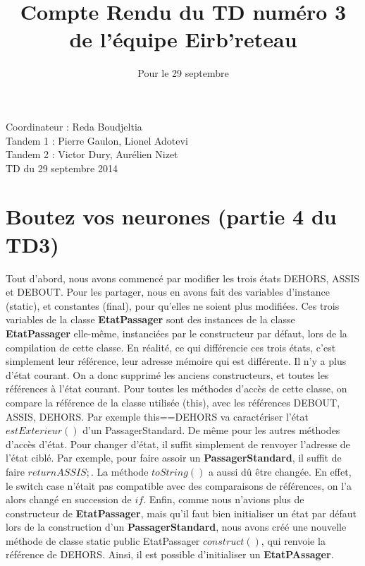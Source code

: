 \documentclass[a4paper,11pts]{article}
\begin{document}
\title{Compte Rendu du TD numéro 3 de l'équipe Eirb'reteau}
\date{Pour le 29 septembre}
\maketitle

\begin{center}
  Coordinateur : Reda Boudjeltia \\
  Tandem 1 : Pierre Gaulon, Lionel Adotevi\\
  Tandem 2 : Victor Dury,  Aurélien Nizet \\
  TD du 29 septembre 2014

\end{center}
\maketitle


\section{Boutez vos neurones (partie 4 du TD3)}
Tout d'abord, nous avons commencé par modifier les trois états DEHORS, ASSIS et DEBOUT. Pour les partager, nous en avons fait des variables d'instance (static), et constantes (final), pour qu'elles ne soient plus modifiées. Ces trois variables de la classe \textbf{EtatPassager} sont des instances de la classe \textbf{EtatPassager} elle-même, instanciées par le constructeur par défaut, lors de la compilation de cette classe. En réalité, ce qui différencie ces trois états, c'est simplement leur référence, leur adresse mémoire qui est différente. Il n'y a plus d'état courant. On a donc supprimé les anciens constructeurs, et toutes les références à l'état courant. Pour toutes les méthodes d'accès de cette classe, on compare la référence de la classe utilisée (this), avec les références DEBOUT, ASSIS, DEHORS. Par exemple this==DEHORS va caractériser l'état $estExterieur()$ d'un PassagerStandard. De même pour les autres méthodes d'accès d'état. Pour changer d'état, il suffit simplement de renvoyer l'adresse de l'état ciblé. Par exemple, pour faire assoir un \textbf{PassagerStandard}, il suffit de faire $return ASSIS;$. La méthode $toString()$ a aussi dû être changée. En effet, le switch case n'était pas compatible avec des comparaisons de références, on l'a alors changé en succession de $if$. Enfin, comme nous n'avions plus de constructeur de \textbf{EtatPassager}, mais qu'il faut bien initialiser un état par défaut lors de la construction d'un \textbf{PassagerStandard}, nous avons créé une nouvelle méthode de classe static public EtatPassager $construct()$, qui renvoie la référence de DEHORS. Ainsi, il est possible d'initialiser un \textbf{EtatPAssager}.
\end{document}

